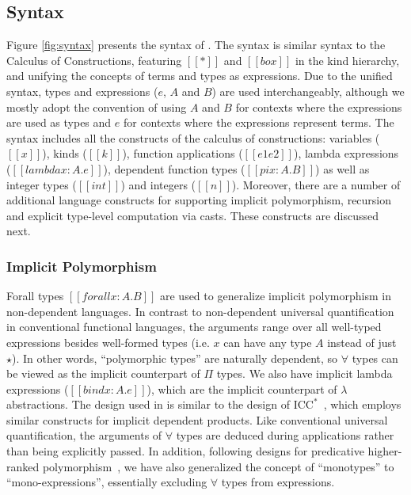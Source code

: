 \subsection{Syntax}

Figure \ref{fig:syntax} presents the syntax of \name. The syntax is similar
syntax to the Calculus of Constructions, featuring
$[[*]]$ and $[[box]]$ in the kind hierarchy, and unifying the concepts of terms
and types as expressions. Due to the unified syntax, types and 
expressions ($e$, $A$ and $B$) are used
interchangeably, although we mostly adopt the convention of using $A$ and $B$
for contexts where the expressions are used as types and $e$ for contexts
where the expressions represent terms.
The syntax includes all the constructs of the calculus of constructions:
variables ($[[x]]$), kinds ($[[k]]$), function applications  ($[[e1 e2]]$),
lambda expressions ($[[lambda x : A. e]]$), dependent function types ($[[pi x : A. B]]$)
as well as integer types ($[[int]]$) and integers ($[[n]]$).
Moreover, there are a number of additional language constructs for
supporting implicit polymorphism, recursion and explicit type-level computation
via casts. These constructs are discussed next.

\subsubsection{Implicit Polymorphism}

Forall types $[[forall x : A. B]]$ are used to generalize implicit
polymorphism in non-dependent languages. In contrast to non-dependent
universal quantification in conventional functional languages, the
arguments range over all well-typed expressions besides well-formed
types (i.e. $x$ can have any type $A$ instead of just $\star$).
In other words, ``polymorphic types'' are naturally dependent, so $\forall$
types can be viewed as the implicit counterpart of $\Pi$ types. We also have
implicit lambda expressions ($[[bind x : A. e]]$), which are the implicit counterpart of
  $\lambda$ abstractions. The design used in \name
  is similar to the design of $\text{ICC}^*$~\cite{barras2008implicit}, which
  employs similar constructs for implicit dependent products. 
Like conventional universal quantification, the arguments of $\forall$ types are
deduced during applications rather than being explicitly passed.
In addition, following designs for predicative higher-ranked polymorphism~\cite{oderskylufer,DK,PJ}, we have also generalized the concept of ``monotypes'' to
``mono-expressions'', essentially excluding $\forall$ types from expressions.

